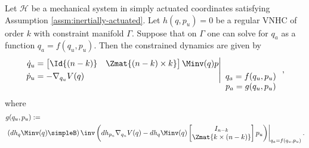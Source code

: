 \begin{thm}\label{thm:zero-dynamics}
    Let \(\mathcal{H}\) be a mechanical system in simply actuated
    coordinates satisfying Assumption \ref{assm:inertially-actuated}. 
    Let \(h(q,p_u) = 0\) be a regular VNHC of order \(k\) with constraint
    manifold \(\Gamma\). Suppose that on \(\Gamma\) one can solve for
    \(q_a\) as a function \(q_a = f(q_u,p_u)\).
    Then the constrained dynamics are given by
    \begin{equation}\label{eqn:qpu-dynamics}
        \left.\begin{aligned}
                \dot{q}_u &= \begin{bmatrix}
                    \Id{(n-k)} & \Zmat{(n-k) \times k}
                \end{bmatrix}\Minv(q)p \\
            \dot{p}_u &= -\nabla_{q_u}V(q) \\
            \end{aligned}{}\right|_{\begin{array}{c}
                q_a = f(q_u,p_u) \\ 
                p_a = g(q_u,p_u) \\
            \end{array}}
            ,
    \end{equation}
    where
    \begin{equation}\label{eqn:g-qpu}
    \begin{aligned}
        &g(q_u,p_u) := \\
           &\left.\left(dh_q \Minv(q) \simpleB \right)\inv 
        \left(dh_{p_u} \nabla_{q_u}V(q) - dh_q \Minv(q)
        \begin{bmatrix}
            I_{n-k} \\
            \Zmat{k \times (n-k)} \\
        \end{bmatrix} p_u\right)\right|_{q_a = f(q_u,p_u)}
        .
    \end{aligned}
    \end{equation}
\end{thm}
